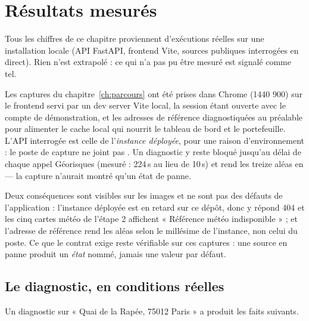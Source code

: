 \chapter{Résultats mesurés}
\label{ch:resultats}

Tous les chiffres de ce chapitre proviennent d'exécutions réelles sur une
installation locale (API FastAPI, frontend Vite, sources publiques interrogées en
direct). Rien n'est extrapolé : ce qui n'a pas pu être mesuré est signalé comme
tel.

\begin{encadre}[title={Environnement des captures et des mesures}]
Les captures du chapitre~\ref{ch:parcours} ont été prises dans Chrome
(1440\,\texttimes\,900) sur le frontend servi par un dev server Vite local, la
session étant ouverte avec le compte de démonstration, et les adresses de
référence diagnostiquées au préalable pour alimenter le cache local qui nourrit
le tableau de bord et le portefeuille. L'API interrogée est celle de
l'\emph{instance déployée}, pour une raison d'environnement : le poste de capture
ne joint pas . Un diagnostic y reste bloqué jusqu'au
délai de chaque appel Géorisques (mesuré : 224\,s au lieu de 10\,s) et rend les
treize aléas en  — la capture
n'aurait montré qu'un état de panne.

Deux conséquences sont visibles sur les images et ne sont pas des défauts de
l'application : l'instance déployée est en retard sur ce dépôt, donc
 y répond 404 et les cinq cartes météo de l'étape 2
affichent « Référence météo indisponible » ; et l'adresse de référence rend les
aléas selon le millésime de l'instance, non celui du poste. Ce que le contrat
exige reste vérifiable sur ces captures : une source en panne produit un
\emph{état} nommé, jamais une valeur par défaut.
\end{encadre}

\section{Le diagnostic, en conditions réelles}

Un diagnostic sur « Quai de la Rapée, 75012 Paris » a produit les faits suivants.


